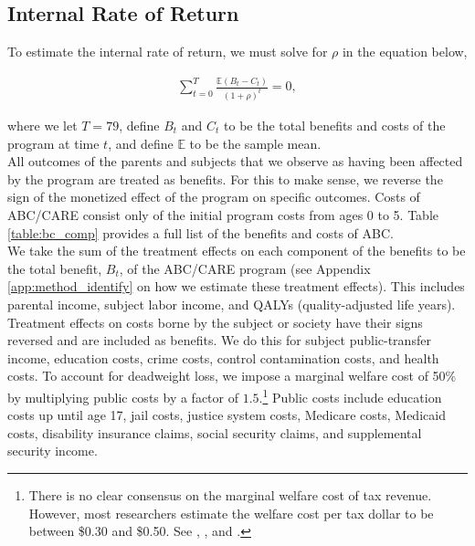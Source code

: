 \subsection{Internal Rate of Return}
\label{app:method_irr}

\noindent To estimate the internal rate of return, we must solve for $\rho$ in the equation below,

\begin{align}
\sum_{t=0}^T \frac{ \mathbb{E} (B_t - C_t)}{(1+\rho)^t} = 0,
\end{align}

\noindent where we let $T = 79$, define $B_t$ and $C_t$ to be the total benefits and costs of the
program at time $t$, and define $\mathbb{E}$ to be the sample mean. \\

\noindent All outcomes of the parents and subjects that we observe as having been affected by the program
are treated as benefits. For this to make sense, we reverse the sign of the monetized effect of the program
on specific outcomes. Costs of ABC/CARE consist only of the initial program costs from ages 0 to 5.
Table \ref{table:bc_comp} provides a full list of the benefits and costs of ABC. \\

\noindent We take the sum of the treatment effects on each component of the benefits to
be the total benefit, $B_t$, of the ABC/CARE program (see Appendix \ref{app:method_identify} on how
we estimate these treatment effects). This includes parental income, subject labor income, and QALYs
(quality-adjusted life years).
Treatment effects on costs borne by the subject or society have their signs
reversed and are included as benefits. We do this for subject public-transfer income,
education costs, crime costs,
control contamination costs, and health costs. To account for deadweight loss, we
impose a marginal welfare cost of 50\% by multiplying public costs by a factor of
$1.5$.\footnote{There is no clear consensus on the marginal welfare cost of tax revenue. However,
most researchers estimate the welfare cost per tax dollar to be between \$0.30 and \$0.50. See
\citet{Feldstein_1999_REStat}, \citet{Heckman_Smith_1998_evaluating}, and \citet{Browning_1987_AER}.} Public costs include education costs up until age 17, jail costs, justice system costs, Medicare costs,
Medicaid costs, disability insurance claims, social security claims, and supplemental security
income. \\

